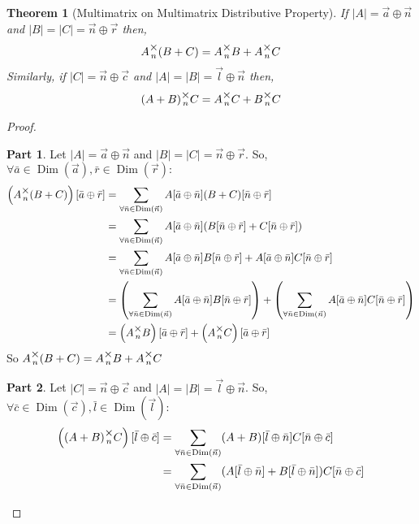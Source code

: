 \documentclass[12pt]{book}
\theoremstyle{plain}
\newtheorem{theorem}{Theorem}[chapter]
\theoremstyle{definition}
\theoremstyle{ppart}
\newtheorem{ppart}{Part}
\theoremstyle{case}
\theoremstyle{solution}
\DeclareMathOperator{\Dim}{Dim}
\newcommand{\mmult}[1]{\text{\raisebox{1ex}{$\underset{#1}{\times}$}}}
\newcommand{\shape}[1]{\left|#1\right|}
\begin{document}
\begin{landscape}
\begin{theorem}[Multimatrix on Multimatrix Distributive Property]
If $\shape{A} = \vec{a} \oplus \vec{n}$ and $\shape{B}=\shape{C}=\vec{n} \oplus \vec{r}$ then,
\[ A \mmult{n} (B + C) = A \mmult{n} B + A \mmult{n} C \]
Similarly, if $\shape{C} = \vec{n} \oplus \vec{c}$ and $\shape{A}=\shape{B}=\vec{l} \oplus \vec{n}$ then,
\[ (A + B) \mmult{n} C = A \mmult{n} C + B \mmult{n} C \]
\end{theorem}
\begin{proof}
\begin{ppart}
Let $\shape{A} = \vec{a} \oplus \vec{n}$ and $\shape{B}=\shape{C}=\vec{n} \oplus \vec{r}$.
So, $\forall \bar{a} \in \Dim(\vec{a}), \bar{r} \in \Dim(\vec{r}) :$
\begin{align*}
 \left( A \mmult{n} (B + C) \right)[\bar{a} \oplus \bar{r}]
 &= \sum_{\forall \bar{n} \in \Dim(\vec{n})}
    A[\bar{a} \oplus \bar{n}] (B + C)[\bar{n} \oplus \bar{r}] \\
 &= \sum_{\forall \bar{n} \in \Dim(\vec{n})}
    A[\bar{a} \oplus \bar{n}] (B[\bar{n} \oplus \bar{r}] + C[\bar{n} \oplus \bar{r}]) \\
 &= \sum_{\forall \bar{n} \in \Dim(\vec{n})}
    A[\bar{a} \oplus \bar{n}] B[\bar{n} \oplus \bar{r}]
  + A[\bar{a} \oplus \bar{n}]C[\bar{n} \oplus \bar{r}] \\
 &= \left( \sum_{\forall \bar{n} \in \Dim(\vec{n})}
    A[\bar{a} \oplus \bar{n}] B[\bar{n} \oplus \bar{r}] \right)
    +
    \left( \sum_{\forall \bar{n} \in \Dim(\vec{n})}
    A[\bar{a} \oplus \bar{n}]C[\bar{n} \oplus \bar{r}] \right) \\
 &= \left( A \mmult{n} B \right)[\bar{a} \oplus \bar{r}] +
     \left( A \mmult{n} C \right)[\bar{a} \oplus \bar{r}]
\end{align*}
So $A \mmult{n} (B + C) = A \mmult{n} B + A \mmult{n} C$
\end{ppart}
\begin{ppart}
Let $\shape{C} = \vec{n} \oplus \vec{c}$ and $\shape{A}=\shape{B}=\vec{l} \oplus \vec{n}$.
So, $\forall \bar{c} \in \Dim(\vec{c}), \bar{l} \in \Dim(\vec{l}) :$
\begin{align*}
 \left( (A + B) \mmult{n} C \right)[\bar{l} \oplus \bar{c}]
 &= \sum_{\forall \bar{n} \in \Dim(\vec{n})}
    (A+B)[\bar{l} \oplus \bar{n}] C[\bar{n} \oplus \bar{c}] \\
 &= \sum_{\forall \bar{n} \in \Dim(\vec{n})}
    (A[\bar{l} \oplus \bar{n}]+B[\bar{l} \oplus \bar{n}])C[\bar{n} \oplus \bar{c}] \\

\end{align*}
\end{ppart}
\end{proof}
\end{landscape}
\end{document}
